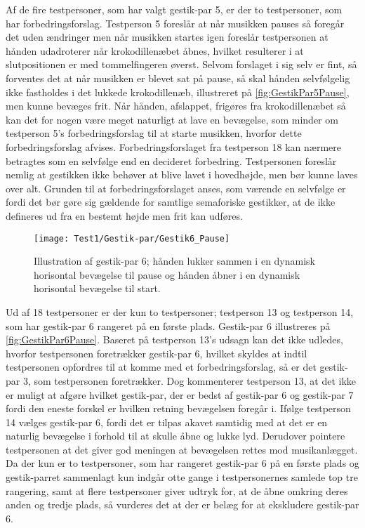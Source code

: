 Af de fire testpersoner, som har valgt gestik-par 5, er der to testpersoner, som har forbedringsforslag. Testperson 5 foreslår at når musikken pauses så foregår det uden ændringer men når musikken startes igen foreslår testpersonen at hånden udadroterer når krokodillenæbet åbnes, hvilket resulterer i at slutpositionen er med tommelfingeren øverst. Selvom forslaget i sig selv er fint, så forventes det at når musikken er blevet sat på pause, så skal hånden selvfølgelig ikke fastholdes i det lukkede krokodillenæb, illustreret på \autoref{fig:GestikPar5Pause}, men kunne bevæges frit. Når hånden, afslappet, frigøres fra krokodillenæbet så kan det for nogen være meget naturligt at lave en bevægelse, som minder om testperson 5's forbedringsforslag til at starte musikken, hvorfor dette forbedringsforslag afvises. Forbedringsforslaget fra testperson 18 kan nærmere betragtes som en selvfølge end en decideret forbedring. Testpersonen foreslår nemlig at gestikken ikke behøver at blive lavet i hovedhøjde, men bør kunne laves over alt. Grunden til at forbedringsforslaget anses, som værende en selvfølge er fordi det bør gøre sig gældende for samtlige semaforiske gestikker, at de ikke defineres ud fra en bestemt højde men frit kan udføres.
%
\begin{figure}[H]
	\centering
	\texttt{[image: Test1/Gestik-par/Gestik6\_Pause]}
	\caption{Illustration af gestik-par 6; hånden lukker sammen i en dynamisk horisontal bevægelse til pause og hånden åbner i en dynamisk horisontal bevægelse til start.}
	\label{fig:GestikPar6Pause}
\end{figure}
\noindent
% 
Ud af 18 testpersoner er der kun to testpersoner; testperson 13 og testperson 14, som har gestik-par 6 rangeret på en første plads. Gestik-par 6 illustreres på \autoref{fig:GestikPar6Pause}. Baseret på testperson 13's udsagn kan det ikke udledes, hvorfor testpersonen foretrækker gestik-par 6, hvilket skyldes at indtil testpersonen opfordres til at komme med et forbedringsforslag, så er det gestik-par 3, som testpersonen foretrækker. Dog kommenterer testperson 13, at det ikke er muligt at afgøre hvilket gestik-par, der er bedst af gestik-par 6 og gestik-par 7 fordi den eneste forskel er hvilken retning bevægelsen foregår i. Ifølge testperson 14 vælges gestik-par 6, fordi det er tilpas akavet samtidig med at det er en naturlig bevægelse i forhold til at skulle åbne og lukke lyd. Derudover pointere testpersonen at det giver god meningen at bevægelsen rettes mod musikanlægget. Da der kun er to testpersoner, som har rangeret gestik-par 6 på en første plads og gestik-parret sammenlagt kun indgår otte gange i testpersonernes samlede top tre rangering, samt at flere testpersoner giver udtryk for, at de åbne omkring deres anden og tredje plads, så vurderes det at der er belæg for at ekskludere gestik-par 6. 
